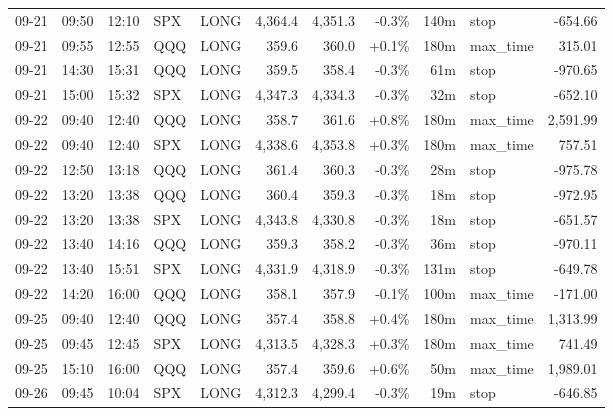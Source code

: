 \documentclass[11pt,a4paper,twoside]{article}
\begin{document}
\begin{center}
\begin{longtable}{>{\color{txtmain}}l l l l l r r r r >{\color{txtmain}}l r}
09-21 & 09:50 & 12:10 & SPX & LONG & 4,364.4 & 4,351.3 & \textcolor{lossred}{-0.3\%} & 140m & stop & \textcolor{lossred}{-654.66} \\
09-21 & 09:55 & 12:55 & QQQ & LONG & 359.6 & 360.0 & \textcolor{wingreen}{+0.1\%} & 180m & max\_time & \textcolor{wingreen}{315.01} \\
09-21 & 14:30 & 15:31 & QQQ & LONG & 359.5 & 358.4 & \textcolor{lossred}{-0.3\%} & 61m & stop & \textcolor{lossred}{-970.65} \\
09-21 & 15:00 & 15:32 & SPX & LONG & 4,347.3 & 4,334.3 & \textcolor{lossred}{-0.3\%} & 32m & stop & \textcolor{lossred}{-652.10} \\
09-22 & 09:40 & 12:40 & QQQ & LONG & 358.7 & 361.6 & \textcolor{wingreen}{+0.8\%} & 180m & max\_time & \textcolor{wingreen}{2,591.99} \\
09-22 & 09:40 & 12:40 & SPX & LONG & 4,338.6 & 4,353.8 & \textcolor{wingreen}{+0.3\%} & 180m & max\_time & \textcolor{wingreen}{757.51} \\
09-22 & 12:50 & 13:18 & QQQ & LONG & 361.4 & 360.3 & \textcolor{lossred}{-0.3\%} & 28m & stop & \textcolor{lossred}{-975.78} \\
09-22 & 13:20 & 13:38 & QQQ & LONG & 360.4 & 359.3 & \textcolor{lossred}{-0.3\%} & 18m & stop & \textcolor{lossred}{-972.95} \\
09-22 & 13:20 & 13:38 & SPX & LONG & 4,343.8 & 4,330.8 & \textcolor{lossred}{-0.3\%} & 18m & stop & \textcolor{lossred}{-651.57} \\
09-22 & 13:40 & 14:16 & QQQ & LONG & 359.3 & 358.2 & \textcolor{lossred}{-0.3\%} & 36m & stop & \textcolor{lossred}{-970.11} \\
09-22 & 13:40 & 15:51 & SPX & LONG & 4,331.9 & 4,318.9 & \textcolor{lossred}{-0.3\%} & 131m & stop & \textcolor{lossred}{-649.78} \\
09-22 & 14:20 & 16:00 & QQQ & LONG & 358.1 & 357.9 & \textcolor{lossred}{-0.1\%} & 100m & max\_time & \textcolor{lossred}{-171.00} \\
09-25 & 09:40 & 12:40 & QQQ & LONG & 357.4 & 358.8 & \textcolor{wingreen}{+0.4\%} & 180m & max\_time & \textcolor{wingreen}{1,313.99} \\
09-25 & 09:45 & 12:45 & SPX & LONG & 4,313.5 & 4,328.3 & \textcolor{wingreen}{+0.3\%} & 180m & max\_time & \textcolor{wingreen}{741.49} \\
09-25 & 15:10 & 16:00 & QQQ & LONG & 357.4 & 359.6 & \textcolor{wingreen}{+0.6\%} & 50m & max\_time & \textcolor{wingreen}{1,989.01} \\
09-26 & 09:45 & 10:04 & SPX & LONG & 4,312.3 & 4,299.4 & \textcolor{lossred}{-0.3\%} & 19m & stop & \textcolor{lossred}{-646.85} \\

\end{longtable}
\end{center}
\end{document}
